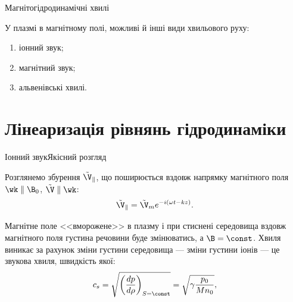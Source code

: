 \documentclass[]{beamer}
\begin{document}
\begin{frame}{Магнітогідродинамічні хвилі}{}
	\begin{block}{}
		У плазмі в магнітному полі, можливі й інші види хвильового руху:

		\begin{enumerate}
			\item іонний звук;
			\item магнітний звук;
			\item альвенівські хвилі.
		\end{enumerate}
	\end{block}
\end{frame}

\section*{Лінеаризація рівнянь гідродинаміки}

\begin{frame}{Іонний звук}{Якісний розгляд}
	\begin{block}{}
		Розглянемо збурення $\tilde{\V}_\parallel$, що поширюється вздовж напрямку магнітного поля $\wk \parallel \B_0$, $\tilde{\V} \parallel \wk$:
		\begin{equation*}
			\tilde{\V}_\parallel = \tilde{\V}_m e^{-i(\omega t - kz)}.
		\end{equation*}
	\end{block}
	\begin{center}
		
	\end{center}
	\begin{block}{}\justifying
		Магнітне поле <<вморожене>> в плазму і при стиснені середовища вздовж магнітного поля густина речовини буде змінюватись, а $\B = \const$. Хвиля виникає за рахунок зміни густини середовища --- зміни густини іонів --- це звукова хвиля, швидкість якої:
		\begin{equation*}
			c_s = \sqrt{\left(\frac{dp}{d\rho}\right)_{S=\const}} = \sqrt{\gamma\frac{p_0}{Mn_0}},
		\end{equation*}
	\end{block}
\end{frame}
\end{document}
